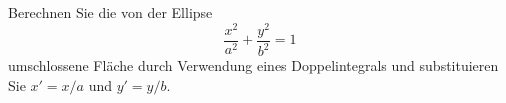\begin{atiTask}[
  title = Fläche einer Ellipse,
  call = Zusatzaufgabe,
]
 Berechnen Sie die von der Ellipse 
 \begin{equation*}
\frac{x^2}{a^2}+\frac{y^2}{b^2}=1
 \end{equation*}
 umschlossene Fläche durch Verwendung eines Doppelintegrals und substituieren Sie $x'=x/a$ und $y'=y/b$. 
\end{atiTask}